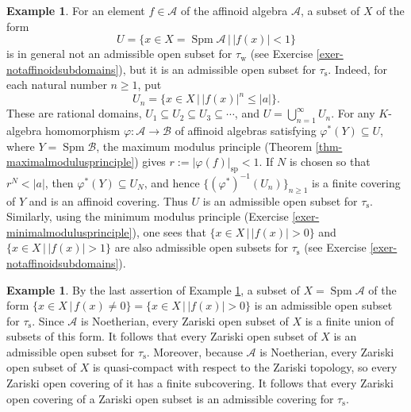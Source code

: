 \documentclass[a4paper,12pt, dvipdfmx]{jsbook}
\def\sp{\mathop{\mathrm{sp}}\nolimits}
\def\Spm{\mathop{\mathrm{Spm}}\nolimits}
\newcommand{\abs}[1]{\lvert#1\rvert}
\theoremstyle{plain}
\theoremstyle{definition}
\newtheorem{exa}[thm]{\bfseries Example}
\begin{document}
\begin{exa}\label{exa-strongadmissiblesets}{\rm 
For an element $f\in\mathcal{A}$ of the affinoid algebra $\mathcal{A}$, a subset of $X$ of the form
$$
U=\{x\in X=\Spm\mathcal{A}\,|\,\abs{f(x)}<1\}
$$
is in general not an admissible open subset for $\tau_{\mathrm{w}}$ (see Exercise \ref{exer-notaffinoidsubdomains}), but it is an admissible open subset for $\tau_{\mathrm{s}}$.
Indeed, for each natural number $n\geq 1$, put
$$
U_n=\{x\in X\,|\,\abs{f(x)}^n\leq\abs{a}\}.
$$
These are rational domains, $U_1\subseteq U_2\subseteq U_3\subseteq\cdots$, and $U=\bigcup^{\infty}_{n=1}U_n$.
For any $K$-algebra homomorphism $\varphi\colon\mathcal{A}\rightarrow\mathcal{B}$ of affinoid algebras satisfying $\varphi^{\ast}(Y)\subseteq U$, where $Y=\Spm\mathcal{B}$, the maximum modulus principle (Theorem \ref{thm-maximalmodulusprinciple}) gives $r:=\abs{\varphi(f)}_{\sp}<1$.
If $N$ is chosen so that $r^N<\abs{a}$, then $\varphi^{\ast}(Y)\subseteq U_N$, and hence $\{(\varphi^{\ast})^{-1}(U_n)\}_{n\geq 1}$ is a finite covering of $Y$ and is an affinoid covering.
Thus $U$ is an admissible open subset for $\tau_{\mathrm{s}}$.
Similarly, using the minimum modulus principle (Exercise \ref{exer-minimalmodulusprinciple}), one sees that $\{x\in X\,|\,\abs{f(x)}>0\}$ and $\{x\in X\,|\,\abs{f(x)}>1\}$ are also admissible open subsets for $\tau_{\mathrm{s}}$ (see Exercise \ref{exer-notaffinoidsubdomains}).}
\end{exa}

\begin{exa}\label{exa-strongadmissiblesetsZar}{\rm 
By the last assertion of Example \ref{exa-strongadmissiblesets}, a subset of $X=\Spm\mathcal{A}$ of the form $\{x\in X\,|\,f(x)\neq 0\}=\{x\in X\,|\,\abs{f(x)}>0\}$ is an admissible open subset for $\tau_{\mathrm{s}}$.
Since $\mathcal{A}$ is Noetherian, every Zariski open subset of $X$ is a finite union of subsets of this form.
It follows that every Zariski open subset of $X$ is an admissible open subset for $\tau_{\mathrm{s}}$.
Moreover, because $\mathcal{A}$ is Noetherian, every Zariski open subset of $X$ is quasi-compact with respect to the Zariski topology, so every Zariski open covering of it has a finite subcovering.
It follows that every Zariski open covering of a Zariski open subset is an admissible covering for $\tau_{\mathrm{s}}$.}
\end{exa}
\end{document}
